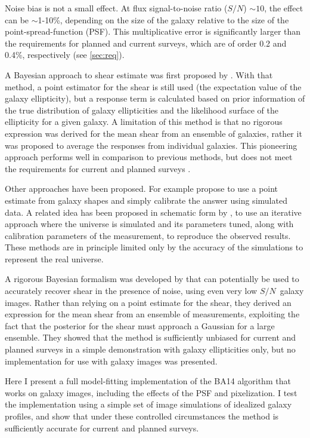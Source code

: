 \documentclass[12pt,preprint]{aastex}
\newcommand{\sn}{$S/N$}
\begin{document}
Noise bias is not a small effect.  At flux signal-to-noise ratio (\sn) $\sim
10$, the effect can be $\sim$1-10\%, depending on the size of the galaxy
relative to the size of the point-spread-function (PSF).  This multiplicative
error is significantly larger than the requirements for planned and current
surveys, which are of order 0.2 and 0.4\%, respectively (see \ref{sec:req}).

A Bayesian approach to shear estimate was first proposed by \cite{Miller07}.
With that method, a point estimator for the shear is still used (the
expectation value of the galaxy ellipticity), but a response term is calculated
based on prior information of the true distribution of galaxy ellipticities and
the likelihood surface of the ellipticity for a given galaxy.  A limitation of
this method is that no rigorous expression was derived for the mean shear from
an ensemble of galaxies, rather it was proposed to average the responses from
individual galaxies.  This pioneering approach performs well in comparison to
previous methods, but does not meet the requirements for current and planned
surveys \citep{ba14}.

Other approaches have been proposed. For example \cite{Zuntz13} propose to use
a point estimate from galaxy shapes and simply calibrate the answer using
simulated data.  A related idea has been proposed in schematic form by
\cite{Refregier13}, to use an iterative approach where the universe is
simulated and its parameters tuned, along with calibration parameters of the
measurement, to reproduce the observed results.  These methods are in principle
limited only by the accuracy of the simulations to represent the real universe.

A rigorous Bayesian formalism was developed by \cite[][herafter BA14]{ba14}
that can potentially be used to accurately recover shear in the presence of
noise, using even very low \sn\ galaxy images.  Rather than relying on a point
estimate for the shear, they derived an expression for the mean shear from an
ensemble of measurements, exploiting the fact that the posterior for the shear
must approach a Gaussian for a large ensemble.  They showed that the method is
sufficiently unbiased for current and planned surveys in a simple demonstration
with galaxy ellipticities only, but no implementation for use with galaxy images
was presented.

Here I present a full model-fitting implementation of the BA14 algorithm that
works on galaxy images, including the effects of the PSF and pixelization.  I
test the implementation using a simple set of image simulations of idealized
galaxy profiles, and show that under these controlled circumstances the method
is sufficiently accurate for current and planned surveys.
\end{document}
